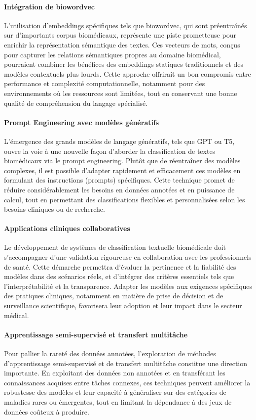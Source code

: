 \documentclass[12pt]{report}
\begin{document}
\paragraph{Intégration de \gls{biowordvec}}  
L’utilisation d’embeddings spécifiques tels que \gls{biowordvec}, qui sont préentraînés sur d’importants corpus biomédicaux, représente une piste prometteuse pour enrichir la représentation sémantique des textes. Ces vecteurs de mots, conçus pour capturer les relations sémantiques propres au domaine biomédical, pourraient combiner les bénéfices des embeddings statiques traditionnels et des modèles contextuels plus lourds. Cette approche offrirait un bon compromis entre performance et complexité computationnelle, notamment pour des environnements où les ressources sont limitées, tout en conservant une bonne qualité de compréhension du langage spécialisé.

\paragraph{Prompt Engineering avec modèles génératifs}  
L’émergence des grands modèles de langage génératifs, tels que GPT ou T5, ouvre la voie à une nouvelle façon d’aborder la classification de textes biomédicaux via le prompt engineering. Plutôt que de réentraîner des modèles complexes, il est possible d’adapter rapidement et efficacement ces modèles en formulant des instructions (prompts) spécifiques. Cette technique promet de réduire considérablement les besoins en données annotées et en puissance de calcul, tout en permettant des classifications flexibles et personnalisées selon les besoins cliniques ou de recherche.

\paragraph{Applications cliniques collaboratives}  
Le développement de systèmes de classification textuelle biomédicale doit s’accompagner d’une validation rigoureuse en collaboration avec les professionnels de santé. Cette démarche permettra d’évaluer la pertinence et la fiabilité des modèles dans des scénarios réels, et d’intégrer des critères essentiels tels que l’interprétabilité et la transparence. Adapter les modèles aux exigences spécifiques des pratiques cliniques, notamment en matière de prise de décision et de surveillance scientifique, favorisera leur adoption et leur impact dans le secteur médical.

\paragraph{Apprentissage semi-supervisé et transfert multitâche}  
Pour pallier la rareté des données annotées, l’exploration de méthodes d’apprentissage semi-supervisé et de transfert multitâche constitue une direction importante. En exploitant des données non annotées et en transférant les connaissances acquises entre tâches connexes, ces techniques peuvent améliorer la robustesse des modèles et leur capacité à généraliser sur des catégories de maladies rares ou émergentes, tout en limitant la dépendance à des jeux de données coûteux à produire.
\end{document}
